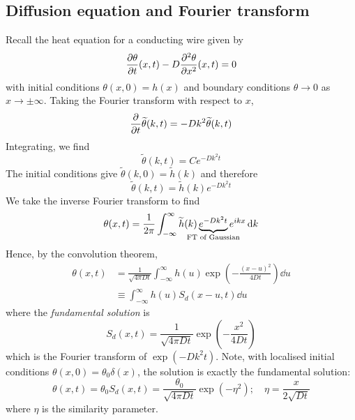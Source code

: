 \subsection{Diffusion equation and Fourier transform}
Recall the heat equation for a conducting wire given by
\[
	\pdv{\theta}{t}\qty(x,t) - D\pdv[2]{\theta}{x}\qty(x,t) = 0
\]
with initial conditions \( \theta(x,0) = h(x) \) and boundary conditions \( \theta \to 0 \) as \( x \to \pm \infty \).
Taking the Fourier transform with respect to \( x \),
\[
	\pdv{t} \widetilde \theta(k,t) = -D k^2 \widetilde \theta(k,t)
\]
Integrating, we find
\[
	\widetilde \theta(k,t) = C e^{-D k^2 t}
\]
The initial conditions give \( \widetilde \theta(k,0) = \widetilde h(k) \) and therefore
\[
	\widetilde \theta(k,t) = \widetilde h(k) e^{-Dk^2 t}
\]
We take the inverse Fourier transform to find
\[
	\theta(x,t) = \frac{1}{2\pi} \int_{-\infty}^\infty \widetilde h(k) \underbrace{e^{-Dk^2 t}}_{\mathclap{\text{FT of Gaussian}}} e^{ikx} \dd{k}
\]
Hence, by the convolution theorem,
\begin{align*}
	\theta(x,t) & = \frac{1}{\sqrt{4 \pi D t}} \int_{-\infty}^\infty h(u) \exp(-\frac{(x-u)^2}{4Dt}) \dd{u} \\
	            & \equiv \int_{-\infty}^\infty h(u) S_d(x-u,t) \dd{u}
\end{align*}
where the \textit{fundamental solution} is
\[
	S_d(x,t) = \frac{1}{\sqrt{4 \pi D t}} \exp(-\frac{x^2}{4Dt})
\]
which is the Fourier transform of \( \exp(-D k^2 t) \).
Note, with localised initial conditions \( \theta(x,0) = \theta_0 \delta(x) \), the solution is exactly the fundamental solution:
\[
	\theta(x,t) = \theta_0 S_d(x,t) = \frac{\theta_0}{\sqrt{4 \pi D t}} \exp(-\eta^2);\quad \eta = \frac{x}{2\sqrt{Dt}}
\]
where \( \eta \) is the similarity parameter.
